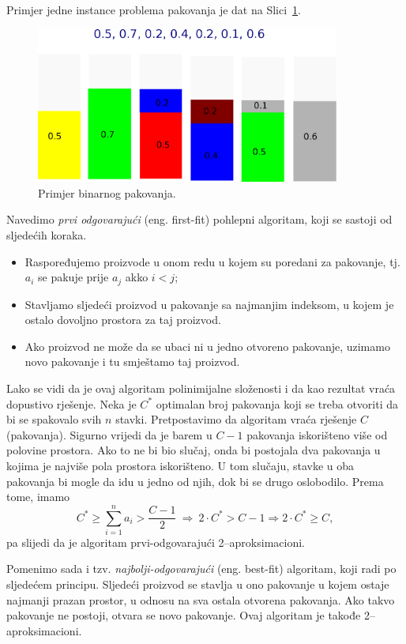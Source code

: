 \documentclass[b5paper, utf8, 11pt, colorlinks]{book}
\theoremstyle{definition}
\begin{document}
  Primjer jedne instance problema pakovanja je dat na Slici~\ref{fig:bin-packing}.
 

\begin{figure}[H] 
	\centering
	\includegraphics[width=100mm]{maxresdefault.eps}%
	\caption{Primjer binarnog pakovanja.}
    \label{fig:bin-packing}
\end{figure}

Navedimo   \emph{prvi odgovarajući} (eng. {first-fit}) pohlepni algoritam, koji se sastoji od sljedećih koraka.
\begin{itemize}
	\item Raspoređujemo proizvode u onom redu u kojem su poredani za pakovanje, tj. $a_i$ se pakuje prije $a_j$ akko $i < j$;
	\item Stavljamo sljedeći proizvod u pakovanje sa najmanjim indeksom, u kojem je ostalo dovoljno prostora za taj proizvod.
	 \item Ako proizvod ne može da se ubaci ni u jedno otvoreno pakovanje, uzimamo novo pakovanje i tu smještamo taj proizvod.
\end{itemize}


Lako se vidi da je ovaj algoritam polinimijalne složenosti i da kao rezultat vraća dopustivo rješenje.  Neka je $C^*$ optimalan broj pakovanja koji se treba otvoriti da bi se spakovalo svih $n$ stavki. Pretpostavimo da algoritam vraća rješenje $C$ (pakovanja). Sigurno vrijedi da je barem u $C-1$ pakovanja  iskorišteno više od polovine prostora. Ako to ne bi bio slučaj, onda bi postojala dva pakovanja u kojima je najviše pola prostora iskorišteno. U tom slučaju, stavke u oba pakovanja bi mogle da idu u jedno od njih, dok bi se drugo oslobodilo. Prema tome, imamo
$$C^* \geq \sum_{i=1}^n a_i > \frac{C-1}{2}\ \Rightarrow\  2 \cdot C^* > C-1 \Rightarrow 2 \cdot C^* \geq C,$$
pa slijedi da je  algoritam  prvi-odgovarajući 2--aproksimacioni. 

Pomenimo sada i tzv. \emph{najbolji-odgovarajući} (eng. best-fit) algoritam, koji radi po sljedećem principu. Sljedeći proizvod se stavlja u ono pakovanje u kojem  ostaje najmanji prazan prostor, u odnosu na sva ostala otvorena pakovanja. Ako takvo pakovanje ne postoji, otvara se novo pakovanje. 
Ovaj algoritam je takođe 2--aproksimacioni. 
\end{document}
